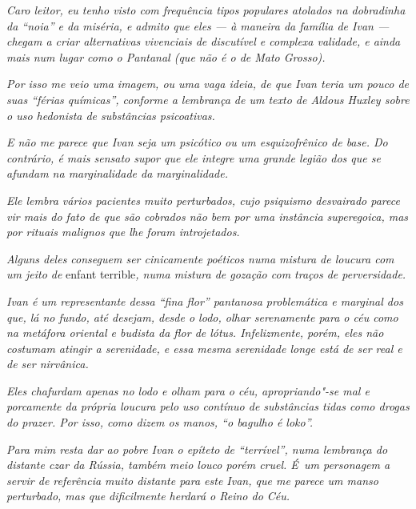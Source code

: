 \emph{Caro leitor, eu tenho visto com frequência tipos populares
atolados na dobradinha da ``noia'' e da miséria, e admito que eles --- à
maneira da família de Ivan --- chegam a criar alternativas vivenciais de
discutível e complexa validade, e ainda mais num lugar como o Pantanal
(que não é o de Mato Grosso).}

\emph{Por isso me veio uma imagem, ou uma vaga ideia, de que Ivan teria
um pouco de suas ``férias químicas'', conforme a lembrança de um texto
de Aldous Huxley sobre o uso hedonista de substâncias psicoativas.}

\emph{E não me parece que Ivan seja um psicótico ou um esquizofrênico de
base. Do contrário, é mais sensato supor que ele integre uma grande
legião dos que se afundam na marginalidade da marginalidade.}

\emph{Ele lembra vários pacientes muito perturbados, cujo psiquismo
desvairado parece vir mais do fato de que são cobrados não bem por uma
instância superegoica, mas por rituais malignos que lhe foram
introjetados.}

\emph{Alguns deles conseguem ser cinicamente poéticos numa mistura de
loucura com um jeito de} enfant terrible\emph{, numa mistura de gozação com
traços de perversidade.}

\emph{Ivan é um representante dessa ``fina flor'' pantanosa problemática
e marginal dos que, lá no fundo, até desejam, desde o lodo, olhar
serenamente para o céu como na metáfora oriental e budista da flor de
lótus. Infelizmente, porém, eles não costumam atingir a serenidade, e
essa mesma serenidade longe está de ser real e de ser nirvânica.}

\emph{Eles chafurdam apenas no lodo e olham para o céu, apropriando"-se
mal e porcamente da própria loucura pelo uso contínuo de substâncias
tidas como drogas do prazer. Por isso, como dizem os manos, ``o bagulho
é loko''.}

\emph{Para mim resta dar ao pobre Ivan o epíteto de ``terrível'', numa
lembrança do distante czar da Rússia, também meio louco porém cruel. É~um personagem a servir de referência muito distante para este Ivan, que me
parece um manso perturbado, mas que dificilmente herdará o Reino do Céu.}
